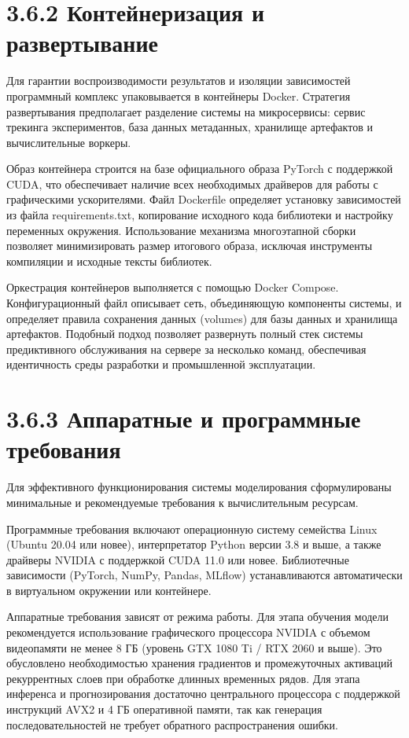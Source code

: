 \documentclass[14pt, a4paper, oneside]{extreport}
\begin{document}
\section{3.6.2 Контейнеризация и развертывание}

Для гарантии воспроизводимости результатов и изоляции зависимостей программный комплекс упаковывается в контейнеры Docker. Стратегия развертывания предполагает разделение системы на микросервисы: сервис трекинга экспериментов, база данных метаданных, хранилище артефактов и вычислительные воркеры.

Образ контейнера строится на базе официального образа PyTorch с поддержкой CUDA, что обеспечивает наличие всех необходимых драйверов для работы с графическими ускорителями. Файл Dockerfile определяет установку зависимостей из файла requirements.txt, копирование исходного кода библиотеки и настройку переменных окружения. Использование механизма многоэтапной сборки позволяет минимизировать размер итогового образа, исключая инструменты компиляции и исходные тексты библиотек.

Оркестрация контейнеров выполняется с помощью Docker Compose. Конфигурационный файл описывает сеть, объединяющую компоненты системы, и определяет правила сохранения данных (volumes) для базы данных и хранилища артефактов. Подобный подход позволяет развернуть полный стек системы предиктивного обслуживания на сервере за несколько команд, обеспечивая идентичность среды разработки и промышленной эксплуатации.

\section{3.6.3 Аппаратные и программные требования}

Для эффективного функционирования системы моделирования сформулированы минимальные и рекомендуемые требования к вычислительным ресурсам.

Программные требования включают операционную систему семейства Linux (Ubuntu 20.04 или новее), интерпретатор Python версии 3.8 и выше, а также драйверы NVIDIA с поддержкой CUDA 11.0 или новее. Библиотечные зависимости (PyTorch, NumPy, Pandas, MLflow) устанавливаются автоматически в виртуальном окружении или контейнере.

Аппаратные требования зависят от режима работы. Для этапа обучения модели рекомендуется использование графического процессора NVIDIA с объемом видеопамяти не менее 8 ГБ (уровень GTX 1080 Ti / RTX 2060 и выше). Это обусловлено необходимостью хранения градиентов и промежуточных активаций рекуррентных слоев при обработке длинных временных рядов. Для этапа инференса и прогнозирования достаточно центрального процессора с поддержкой инструкций AVX2 и 4 ГБ оперативной памяти, так как генерация последовательностей не требует обратного распространения ошибки.
\end{document}

